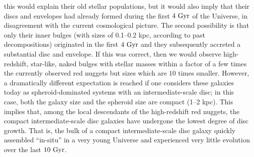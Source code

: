 \documentclass[useAMS,usenatbib,article]{mnras}
\begin{document}
this would explain their old stellar populations, 
but it would also imply that their discs and envelopes had already formed during the first $4~\rm Gyr$ of the Universe, 
in disagreement with the current cosmological picture. 
The second possibility is that only their inner bulges (with sizes of 0.1--0.2 kpc, 
according to past decompositions) originated in the first $4~\rm Gyr$ 
and they subsequently accreted a substantial disc and envelope. 
If this was correct, then we would observe high-redshift, star-like, naked bulges with stellar masses 
within a factor of a few times the currently observed red nuggets but sizes which are $10$ times smaller. 
However, a dramatically different expectation is reached 
if one considers these galaxies today as spheroid-dominated systems with an intermediate-scale disc; 
in this case, both the galaxy size and the spheroid size are compact (1--2 kpc). 
This implies that, among the local descendants of the high-redshift red nuggets, 
the compact intermediate-scale disc galaxies have undergone the lowest degree of disc growth. 
That is, the bulk of a compact intermediate-scale disc galaxy quickly assembled ``in-situ'' in a very young Universe 
and experienced very little evolution over the last $10~\rm Gyr$.
\end{document}
